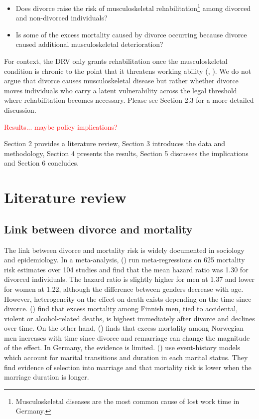 \documentclass[a4paper,12pt]{article}
\theoremstyle{plain}
\theoremstyle{definition}
\theoremstyle{TheoremNum}
\theoremstyle{CorollaryNum}
\theoremstyle{PropositionNum}
\theoremstyle{TheoremNum}
\begin{document}
\begin{itemize}
    \item[\textbf{RQ1:}] Does divorce raise the risk of musculoskeletal rehabilitation\footnote{Musculoskeletal diseases are the most common cause of lost work time in Germany.} among divorced and non-divorced individuals?
    \item[\textbf{RQ2:}] Is some of the excess mortality caused by divorce occurring because divorce caused additional musculoskeletal deterioration?
\end{itemize}

For context, the DRV only grants rehabilitation once the musculoskeletal condition is chronic to the point that it threatens working ability (\citeauthor{drv2005leitlinien}, \citeyear{drv2005leitlinien}). We do not argue that divorce causes musculoskeletal disease but rather whether divorce moves individuals who carry a latent vulnerability across the legal threshold where rehabilitation becomes necessary. Please see Section 2.3 for a more detailed discussion. 

\textcolor{red}{Results... maybe policy implications?}

Section 2 provides a literature review, Section 3 introduces the data and methodology, Section 4 presents the results, Section 5 discusses the implications and Section 6 concludes.

\section{Literature review}
\subsection{Link between divorce and mortality}
The link between divorce and mortality risk is widely documented in sociology and epidemiology. In a meta-analysis, \citeauthor*{shor2012meta} (\citeyear{shor2012meta}) run meta-regressions on 625 mortality risk estimates over 104 studies and find that the mean hazard ratio was 1.30 for divorced individuals. The hazard ratio is slightly higher for men at 1.37 and lower for women at 1.22, although the difference between genders decrease with age. However, heterogeneity on the effect on death exists depending on the time since divorce. \citeauthor{metsa2013divorce} (\citeyear{metsa2013divorce}) find that excess mortality among Finnish men, tied to accidental, violent or alcohol-related deaths, is highest immediately after divorce and declines over time. On the other hand, \citeauthor{berntsen2012relationship} (\citeyear{berntsen2012relationship}) finds that excess mortality among Norwegian men increases with time since divorce and remarriage can change the magnitude of the effect. In Germany, the evidence is limited. \citeauthor{brockmann2004love} (\citeyear{brockmann2004love}) use event-history models which account for marital transitions and duration in each marital status. They find evidence of selection into marriage and that mortality risk is lower when the marriage duration is longer. 
\end{document}
